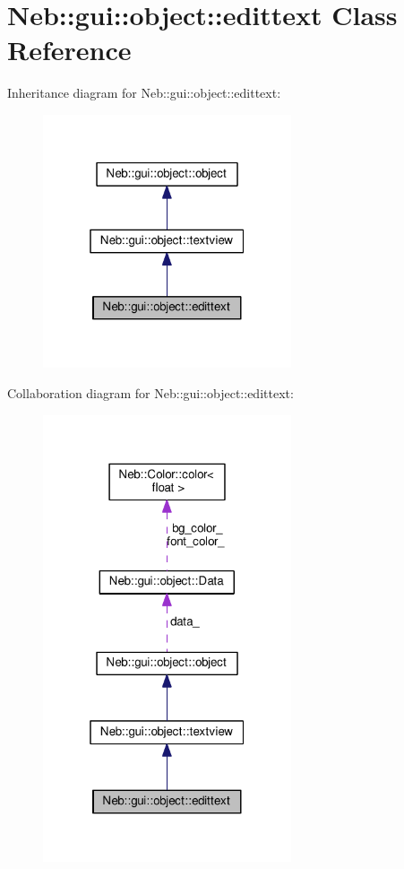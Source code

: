 \hypertarget{classNeb_1_1gui_1_1object_1_1edittext}{\section{Neb\-:\-:gui\-:\-:object\-:\-:edittext Class Reference}
\label{classNeb_1_1gui_1_1object_1_1edittext}
}


Inheritance diagram for Neb\-:\-:gui\-:\-:object\-:\-:edittext\-:
\nopagebreak
\begin{figure}[H]
\begin{center}
\leavevmode
\includegraphics[width=208pt]{classNeb_1_1gui_1_1object_1_1edittext__inherit__graph}
\end{center}
\end{figure}


Collaboration diagram for Neb\-:\-:gui\-:\-:object\-:\-:edittext\-:
\nopagebreak
\begin{figure}[H]
\begin{center}
\leavevmode
\includegraphics[width=208pt]{classNeb_1_1gui_1_1object_1_1edittext__coll__graph}
\end{center}
\end{figure}
